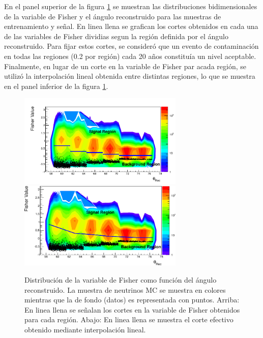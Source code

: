 	En el panel superior de la figura \ref{fig:fisher2dDGL} se muestran las distribuciones bidimensionales de la variable de Fisher y el ángulo reconstruido para las muestras de entrenamiento y señal. En linea llena se grafican los cortes obtenidos en cada una de las variables de Fisher dividias segun la región definida por el ángulo reconstruido.
	Para fijar estos cortes, se consideró que un evento de contaminación en todas las regiones (0.2 por región) cada 20 años constituía un nivel aceptable.
	Finalmente, en lugar de un corte en la variable de Fisher par acada región, se utilizó la interpolación lineal obtenida entre distintas regiones, lo que se muestra en el panel inferior de la figura \ref{fig:fisher2dDGL}.
	\begin{figure}[ht]
	\begin{center}
	\includegraphics[width=0.7\textwidth]{fig/seleccionAuger/fisher2dDGL}\\
	\includegraphics[width=0.7\textwidth]{fig/seleccionAuger/fisher2dInterpolDGL}
	\caption{Distribución de la variable de Fisher como función del ángulo reconstruido. La muestra de neutrinos MC se muestra en colores mientras que la de fondo (datos) es representada con puntos. Arriba: En linea llena se señalan los cortes en la variable de Fisher obtenidos para cada región. Abajo: En linea llena se muestra el corte efectivo obtenido mediante interpolación lineal.}
	\label{fig:fisher2dDGL}
	\end{center}
	\end{figure}
	\clearpage
	
